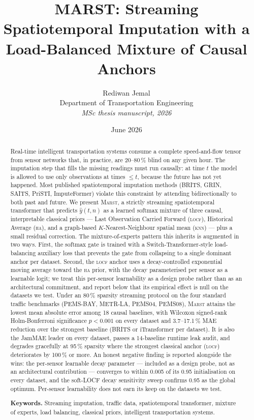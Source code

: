 \documentclass[11pt]{article}
\title{\vspace{-1.0cm}\sffamily\bfseries
       MARST: Streaming Spatiotemporal Imputation with a\\
       Load-Balanced Mixture of Causal Anchors}
\author{Rediwan Jemal\\[2pt]
        \small Department of Transportation Engineering\\[-1pt]
        \small\itshape MSc thesis manuscript, 2026}
\date{\vspace{-6pt}\small June 2026}
\newcommand{\MARST}{\textsc{Marst}\xspace}
\newcommand{\LOCF}{\textsc{locf}\xspace}
\newcommand{\HA}{\textsc{ha}\xspace}
\newcommand{\KNN}{\textsc{knn}\xspace}
\begin{document}
\maketitle
\thispagestyle{fancy}

\begin{abstract}
\noindent
Real-time intelligent transportation systems consume a complete
speed-and-flow tensor from sensor networks that, in practice, are
20--80\,\% blind on any given hour.  The imputation step that fills the
missing readings must run causally: at time $t$ the model is allowed
to use only observations at times $\leq t$, because the future has not
yet happened.  Most published spatiotemporal imputation methods
(BRITS, GRIN, SAITS, PriSTI, ImputeFormer) violate this constraint by
attending bidirectionally to both past and future.  We present
\MARST, a strictly streaming spatiotemporal transformer that predicts
$\hat{y}(t, n)$ as a learned softmax mixture of three causal,
interpretable classical priors --- Last Observation Carried Forward
(\LOCF), Historical Average (\HA), and a graph-based
$K$-Nearest-Neighbour spatial mean (\KNN) --- plus a small residual
correction.  The mixture-of-experts pattern this inherits is augmented
in two ways.  First, the softmax gate is trained with a
Switch-Transformer-style load-balancing auxiliary loss that prevents
the gate from collapsing to a single dominant anchor per dataset.
Second, the \LOCF anchor uses a decay-controlled exponential moving
average toward the \HA prior, with the decay parameterised per sensor
as a learnable logit; we treat this per-sensor learnability as a design
probe rather than as an architectural commitment, and report below that
its empirical effect is null on the datasets we test.  Under an
80\,\% sparsity streaming protocol on the four standard traffic
benchmarks (PEMS-BAY, METR-LA, PEMS04, PEMS08), \MARST attains the
lowest mean absolute error among 18 causal baselines, with Wilcoxon
signed-rank Holm-Bonferroni significance $p < 0.001$ on every dataset
and 3.7--17.1\,\% MAE reduction over the strongest baseline (BRITS or
iTransformer per dataset).  It is also the JamMAE leader on every
dataset, passes a 14-baseline runtime leak audit, and degrades
gracefully at 95\,\% sparsity where the strongest classical anchor
(\LOCF) deteriorates by 100\,\% or more.  An honest negative finding
is reported alongside the wins: the per-sensor learnable decay
parameter --- included as a design probe, not as an architectural
contribution --- converges to within 0.005 of its 0.95 initialisation
on every dataset, and the soft-LOCF decay sensitivity sweep confirms
0.95 as the global optimum.  Per-sensor learnability does not earn its
keep on the datasets we test.

\medskip
\noindent\textbf{Keywords.}  Streaming imputation, traffic data,
spatiotemporal transformer, mixture of experts, load balancing,
classical priors, intelligent transportation systems.
\end{abstract}
\end{document}
